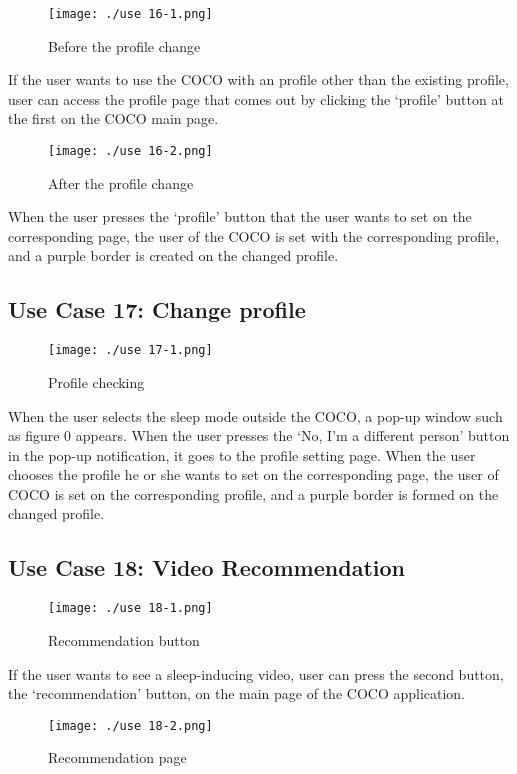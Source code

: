 \documentclass[conference]{IEEEtran}
\begin{document}
\begin{figure}[H]
\texttt{[image: ./use 16-1.png]}
\centering
\caption{Before the profile change}
\end{figure}

If the user wants to use the COCO with an profile other than the existing profile, user can access the profile page that comes out by clicking the ‘profile' button at the first on the COCO main page.

\begin{figure}[H]
\texttt{[image: ./use 16-2.png]}
\centering
\caption{After the profile change}
\end{figure}

When the user presses the ‘profile’ button that the user wants to set on the corresponding page, the user of the COCO is set with the corresponding profile, and a purple border is created on the changed profile.

\subsection{Use Case 17: Change profile}

\begin{figure}[H]
\texttt{[image: ./use 17-1.png]}
\centering
\caption{Profile checking}
\end{figure}

When the user selects the sleep mode outside the COCO, a pop-up window such as figure 0 appears. When the user presses the ‘No, I'm a different person' button in the pop-up notification, it goes to the profile setting page. When the user chooses the profile he or she wants to set on the corresponding page, the user of COCO is set on the corresponding profile, and a purple border is formed on the changed profile.

\subsection{Use Case 18: Video Recommendation}

\begin{figure}[H]
\texttt{[image: ./use 18-1.png]}
\centering
\caption{Recommendation button}
\end{figure}

If the user wants to see a sleep-inducing video, user can press the second button, the ‘recommendation’ button, on the main page of the COCO application.

\begin{figure}[H]
\texttt{[image: ./use 18-2.png]}
\centering
\caption{Recommendation page}
\end{figure}
\end{document}
